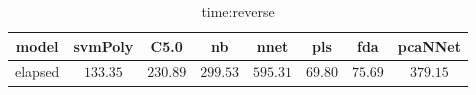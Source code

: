 \begin{table}[!ht]
	\centering
	\begin{tabular}{|c|c|c|c|c|c|c|c|}
		\hline
		model & svmPoly & C5.0 & nb & nnet & pls & fda & pcaNNet \\ \hline
		elapsed & $133.35$ & $230.89$ & $299.53$ & $595.31$ & $69.80$ & $75.69$ & $379.15$ \\ \hline
	\end{tabular}
	\caption{time:reverse}
	\label{tab:time:reverse}
\end{table}
